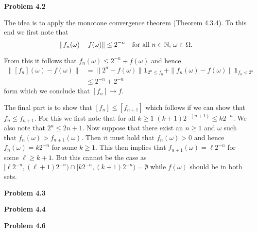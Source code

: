 
\textbf{Problem 4.2}

The idea is to apply the monotone convergence theorem (Theorem 4.3.4). To this end we first note that
\[
	\| f_n(\omega) - f(\omega) \| \le 2^{-n} \quad \text{for all } n \in \mathbb N, \, \omega \in \Omega.
\] 

From this it follows that $f_n(\omega) \le 2^{-n} + f(\omega)$ and hence
\begin{align*}
	\|[f_n](\omega) - f(\omega)\| 
	&= \|2^n - f(\omega)\| \mathbf{1}_{2^n \le f_n} + \|f_n(\omega) - f(\omega)\|\mathbf{1}_{f_n < 2^n}\\
	&\le 2^{-n} + 2^{-n}
\end{align*}
form which we conclude that $[f_n] \to f$.

The final part is to show that $[f_n] \le [f_{n+1}]$ which follows if we can show that $f_n \le f_{n+1}$. For this we first note that for all $k \ge 1$ $(k+1) 2^{-(n+1)} \le k 2^{-n}$. We also note that $2^{n} \le 2{n+1}$. Now suppose that there exist an $n \ge 1$ and $\omega$ such that $f_n(\omega) > f_{n + 1}(\omega)$. Then it must hold that $f_n(\omega) > 0$ and hence $f_n(\omega) = k 2^{-n}$ for some $k \ge 1$. This then implies that $f_{n+1}(\omega) = \ell 2^{-n}$ for some $\ell \ge k+1$. But this cannot be the case as $[\ell 2^{-n}, (\ell+1)2^{-n}) \cap [k 2^{-n}, (k+1)2^{-n}) = \emptyset$ while $f(\omega)$ should be in both sets.

\bigskip

\textbf{Problem 4.3}

\bigskip

\textbf{Problem 4.4}

\bigskip

\textbf{Problem 4.6}

